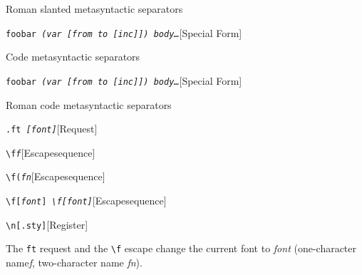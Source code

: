 \documentclass{book}
\begin{document}
%
Roman slanted metasyntactic separators

\noindent\texttt{foobar \EmbracOn{}\textsl{(var \EmbracOff{}\texttt{[}\EmbracOn{}from to \EmbracOff{}\texttt{[}\EmbracOn{}inc\EmbracOff{}\texttt{]]}\EmbracOn{}) body\dots{}\@}}\hfill[Special Form]



%
Code metasyntactic separators

\noindent\texttt{foobar \EmbracOn{}\textsl{(var \EmbracOff{}\textnormal{\texttt{[}}\EmbracOn{}from to \EmbracOff{}\textnormal{\texttt{[}}\EmbracOn{}inc\EmbracOff{}\textnormal{\texttt{]]}}\EmbracOn{}) body\dots{}\@}}\hfill[Special Form]



%
Roman code metasyntactic separators

\noindent\texttt{\texttt{.ft} \EmbracOn{}\textsl{[\EmbracOff{}\textnormal{\textsl{font}}\EmbracOn{}]}}\hfill[Request]



%
\noindent\texttt{\texttt{\textbackslash{}f}\textnormal{\textsl{f}}\texttt{}}\hfill[Escape\hbox{}sequence]



%
\noindent\texttt{\texttt{\textbackslash{}f(}\textnormal{\textsl{fn}}\texttt{}}\hfill[Escape\hbox{}sequence]



%
\noindent\texttt{\texttt{\textbackslash{}f[}\textnormal{\textsl{font}}\texttt{]} \EmbracOn{}\textsl{\EmbracOff{}\texttt{\textbackslash{}f[}\EmbracOn{}\EmbracOff{}\textnormal{\textsl{font}}\EmbracOn{}\EmbracOff{}\texttt{]}\EmbracOn{}}}\hfill[Escape\hbox{}sequence]



%
\noindent\texttt{\texttt{\textbackslash{}n[.sty]}}\hfill[Register]



%
The \texttt{ft} request and the \texttt{\textbackslash{}f} escape change the current font
to \textsl{font} (one-character name\hbox{}\textsl{f}, two-character name
\textsl{fn}).
\end{document}
